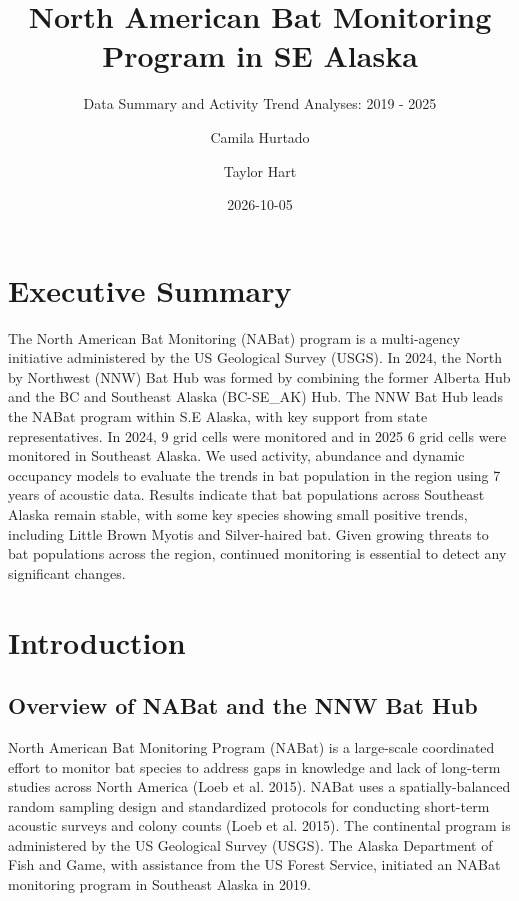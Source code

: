 \documentclass[
  letterpaper,
  DIV=11,
  numbers=noendperiod]{scrartcl}
\title{North American Bat Monitoring Program in SE Alaska}
\subtitle{Data Summary and Activity Trend Analyses: 2019 - 2025}
\author{Camila Hurtado \and Taylor Hart}
\date{2026-10-05}
\renewcommand*\contentsname{Table of contents}
\newcommand\contentsname{Table of contents}
\begin{document}
\maketitle

\clearpage

\renewcommand*\contentsname{Table of contents}
{
\hypersetup{linkcolor=black}
\setcounter{tocdepth}{3}
\tableofcontents
}

\newpage{}

\section{Executive Summary}\label{executive-summary}

The North American Bat Monitoring (NABat) program is a multi-agency
initiative administered by the US Geological Survey (USGS). In 2024, the
North by Northwest (NNW) Bat Hub was formed by combining the former
Alberta Hub and the BC and Southeast Alaska (BC-SE\_AK) Hub. The NNW Bat
Hub leads the NABat program within S.E Alaska, with key support from
state representatives. In 2024, 9 grid cells were monitored and in 2025
6 grid cells were monitored in Southeast Alaska. We used activity,
abundance and dynamic occupancy models to evaluate the trends in bat
population in the region using 7 years of acoustic data. Results
indicate that bat populations across Southeast Alaska remain stable,
with some key species showing small positive trends, including Little
Brown Myotis and Silver-haired bat. Given growing threats to bat
populations across the region, continued monitoring is essential to
detect any significant changes.

\newpage{}

\section{Introduction}\label{introduction}

\subsection{Overview of NABat and the NNW Bat
Hub}\label{overview-of-nabat-and-the-nnw-bat-hub}

North American Bat Monitoring Program (NABat) is a large-scale
coordinated effort to monitor bat species to address gaps in knowledge
and lack of long-term studies across North America (Loeb et al. 2015).
NABat uses a spatially-balanced random sampling design and standardized
protocols for conducting short-term acoustic surveys and colony counts
(Loeb et al. 2015). The continental program is administered by the US
Geological Survey (USGS). The Alaska Department of Fish and Game, with
assistance from the US Forest Service, initiated an NABat monitoring
program in Southeast Alaska in 2019.
\end{document}
